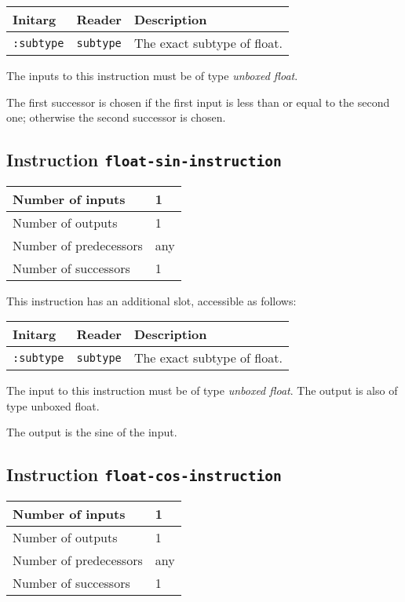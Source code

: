 \begin{tabular}{|l|l|l|}
  \hline
  Initarg & Reader & Description\\
  \hline\hline
  \texttt{:subtype} & \texttt{subtype} & The exact subtype of float.\\
  \hline
\end{tabular}

The inputs to this instruction must be of type \emph{unboxed
  float}.

The first successor is chosen if the first input is less than or equal
to the second one; otherwise the second successor is chosen.

\subsection{Instruction \texttt{float-sin-instruction}}
\label{hir-instruction-float-div}

\begin{tabular}{|l|l|}
\hline
Number of inputs & 1\\
\hline
Number of outputs & 1\\
\hline
Number of predecessors & any\\
\hline
Number of successors & 1\\
\hline
\end{tabular}

This instruction has an additional slot, accessible as follows:

\begin{tabular}{|l|l|l|}
  \hline
  Initarg & Reader & Description\\
  \hline\hline
  \texttt{:subtype} & \texttt{subtype} & The exact subtype of float.\\
  \hline
\end{tabular}

The input to this instruction must be of type \emph{unboxed
  float}. The output is also of type unboxed float.

The output is the sine of the input.

\subsection{Instruction \texttt{float-cos-instruction}}
\label{hir-instruction-float-div}

\begin{tabular}{|l|l|}
\hline
Number of inputs & 1\\
\hline
Number of outputs & 1\\
\hline
Number of predecessors & any\\
\hline
Number of successors & 1\\
\hline
\end{tabular}

